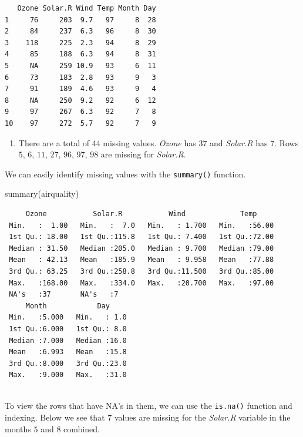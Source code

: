 \documentclass[
  letterpaper,
  DIV=11,
  numbers=noendperiod]{scrreprt}
\newenvironment{Shaded}{\begin{snugshade}}{\end{snugshade}}
\newcommand{\FunctionTok}[1]{\textcolor[rgb]{0.28,0.35,0.67}{#1}}
\newcommand{\NormalTok}[1]{\textcolor[rgb]{0.00,0.23,0.31}{#1}}
\providecommand{\tightlist}{%
  \setlength{\itemsep}{0pt}\setlength{\parskip}{0pt}}\usepackage{longtable,booktabs,array}
\begin{document}
\begin{verbatim}
   Ozone Solar.R Wind Temp Month Day
1     76     203  9.7   97     8  28
2     84     237  6.3   96     8  30
3    118     225  2.3   94     8  29
4     85     188  6.3   94     8  31
5     NA     259 10.9   93     6  11
6     73     183  2.8   93     9   3
7     91     189  4.6   93     9   4
8     NA     250  9.2   92     6  12
9     97     267  6.3   92     7   8
10    97     272  5.7   92     7   9
\end{verbatim}

\begin{enumerate}
\def\labelenumi{\arabic{enumi}.}
\setcounter{enumi}{2}
\tightlist
\item
  There are a total of \(44\) missing values. \emph{Ozone} has \(37\)
  and \emph{Solar.R} has \(7\). Rows \(5\), \(6\), \(11\), \(27\),
  \(96\), \(97\), \(98\) are missing for \emph{Solar.R}.
\end{enumerate}

We can easily identify missing values with the \texttt{summary()}
function.

\begin{Shaded}
\begin{Highlighting}[numbers=left,,]
\FunctionTok{summary}\NormalTok{(airquality)}
\end{Highlighting}
\end{Shaded}

\begin{verbatim}
     Ozone           Solar.R           Wind             Temp      
 Min.   :  1.00   Min.   :  7.0   Min.   : 1.700   Min.   :56.00  
 1st Qu.: 18.00   1st Qu.:115.8   1st Qu.: 7.400   1st Qu.:72.00  
 Median : 31.50   Median :205.0   Median : 9.700   Median :79.00  
 Mean   : 42.13   Mean   :185.9   Mean   : 9.958   Mean   :77.88  
 3rd Qu.: 63.25   3rd Qu.:258.8   3rd Qu.:11.500   3rd Qu.:85.00  
 Max.   :168.00   Max.   :334.0   Max.   :20.700   Max.   :97.00  
 NA's   :37       NA's   :7                                       
     Month            Day      
 Min.   :5.000   Min.   : 1.0  
 1st Qu.:6.000   1st Qu.: 8.0  
 Median :7.000   Median :16.0  
 Mean   :6.993   Mean   :15.8  
 3rd Qu.:8.000   3rd Qu.:23.0  
 Max.   :9.000   Max.   :31.0  
                               
\end{verbatim}

To view the rows that have NA's in them, we can use the \texttt{is.na()}
function and indexing. Below we see that \(7\) values are missing for
the \emph{Solar.R} variable in the months \(5\) and \(8\) combined.
\end{document}

